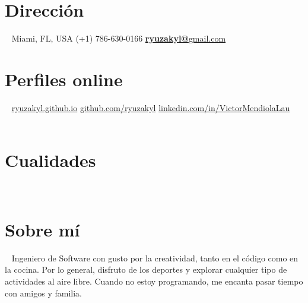 \documentclass[]{friggeri-cv}
\begin{document}
      

\begin{aside}
  \section{Dirección}
  	~
    Miami, FL, USA
    (+1) 786-630-0166
    \href{mailto:ryuzakyl@gmail.com}{\textbf{ryuzakyl@}gmail.com}
    ~
    ~
    ~
  \section{Perfiles online}
  	~
    \href{https://ryuzakyl.github.io}{{\scriptsize ryuzakyl.github.io}}
    \href{https://github.com/ryuzakyl}{{\scriptsize github.com/ryuzakyl}}
    \href{https://www.linkedin.com/in/victormendiolalau}{{\scriptsize linkedin.com/in/VictorMendiolaLau}}
    ~
    ~
    ~
  \section{Cualidades}
    ~
    ~
    ~
    ~
  \section{Sobre mí}
    ~
	Ingeniero de Software con gusto por la creatividad, tanto en el código como en la cocina. Por lo general, disfruto de los deportes y explorar cualquier tipo de actividades al aire libre. Cuando no estoy programando, me encanta pasar tiempo con amigos y familia.
\end{aside}
\end{document}
